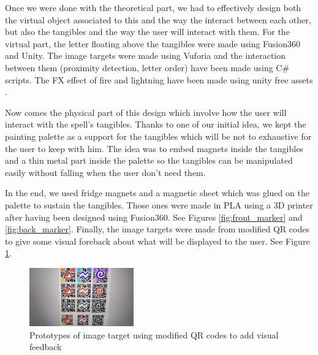 \documentclass[sigchi, authorversion, screen]{acmart}
\begin{document}
Once we were done with the theoretical part, we had to effectively design both the virtual object associated to this and the way the interact between each other, but also the tangibles and the way the user will interact with them.
For the virtual part, the letter floating above the tangibles were made using Fusion360 \cite{fusion360} and Unity. The image targets were made using Vuforia and the interaction between them (proximity detection, letter order) have been made using C\# scripts. The FX effect of fire and lightning have been made using unity free assets \cite{lightningbolts} \cite{unityparticles}.


Now comes the physical part of this design which involve how the user will interact with the spell’s tangibles. Thanks to one of our initial idea, we kept the painting palette as a support for the tangibles which will be not to exhaustive for the user to keep with him. The idea was to embed magnets inside the tangibles and a thin metal part inside the palette so the tangibles can be manipulated easily without falling when the user don’t need them. 

In the end, we used fridge magnets and a magnetic sheet which was glued on the palette to sustain the tangibles. Those ones were made in PLA using a 3D printer after having been designed using Fusion360. See Figures \ref{fig:front_marker} and \ref{fig:back_marker}. Finally, the image targets were made from modified QR codes to give some visual foreback about what will be displayed to the user. See Figure \ref{fig:marker_prototypes}.

\begin{figure}
    \includegraphics[width=0.4\textwidth]{Images/markers.jpeg}
    \caption{Prototypes of image target using modified QR codes to add visual feedback}
    \label{fig:marker_prototypes}
\end{figure}
\end{document}
